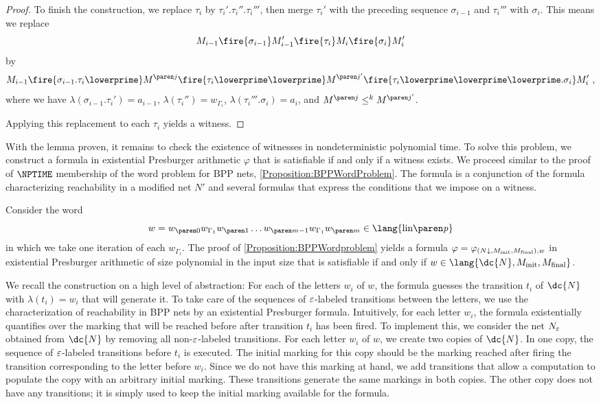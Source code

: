 \documentclass[../../diss.tex]{subfiles}
\begin{document}
\begin{proof}
    To finish the construction, we replace $\tau_i$ by $\tau_i'.\tau_i''.\tau_i'''$, then merge $\tau_i'$ with the preceding sequence $\sigma_{i-1}$ and $\tau_i'''$ with $\sigma_{i}$.
    This means we replace
    \[
        M_{i-1} \fire{\sigma_{i-1}} M_{i-1}' \fire{\tau_i} M_i \fire{\sigma_i} M_i'
    \]
    by
    \[
        M_{i-1} \fire{\sigma_{i-1}.\tau_i\lowerprime} \itr{M}{j} \fire{\tau_i\lowerprime\lowerprime} \itr{M}{j'} \fire{\tau_i\lowerprime\lowerprime\lowerprime.\sigma_i} M_i'
        \ ,
    \]
    where we have $\lambda(\sigma_{i-1}.\tau_i') = a_{i-1}$,
    $\lambda(\tau_i'') = w_{\Gamma_i}$,
    $\lambda(\tau_i'''.\sigma_{i}) = a_{i}$,
    and $\itr{M}{j} \leqk \itr{M}{j'}$.

    Applying this replacement to each $\tau_i$ yields a witness.
\end{proof}

With the lemma proven, it remains to check the existence of witnesses in nondeterministic polynomial time.
To solve this problem, we construct a formula in existential Presburger arithmetic $\varphi$ that is satisfiable if and only if a witness exists.
We proceed similar to the proof of $\NPTIME$ membership of the word problem for BPP nets, \cref{Proposition:BPPWordProblem}.
The formula is a conjunction of the formula characterizing reachability in a modified net $N'$ and several formulas that express the conditions that we impose on a witness.

Consider the word
\[
    w = \dtr{w}{0} w_{\Gamma_1} \dtr{w}{1} \ldots \dtr{w}{m-1} w_{\Gamma_1} \dtr{w}{m} \in \lang{\linof{\product}}
\]
in which we take one iteration of each $w_{\Gamma_i}$.
The proof of \cref{Proposition:BPPWordproblem} yields a formula
$\varphi = \varphi_{({N \downarrow},M_{\text{init}},M_{\text{final}}),w}$ in existential Presburger arithmetic
of size polynomial in the input size that is satisfiable if and only if $w \in \lang{\dc{N},\Minit,\Mfinal}$.

We recall the construction on a high level of abstraction:
For each of the letters $w_i$ of $w$, the formula guesses the transition $t_i$ of $\dc{N}$ with $\lambda(t_i) = w_i$ that will generate it.
To take care of the sequences of $\varepsilon$-labeled transitions between the letters, we use the characterization of reachability in BPP nets by an existential Presburger formula.
Intuitively, for each letter $w_i$, the formula existentially quantifies over the marking that will be reached before \resp after transition $t_i$ has been fired.
To  implement this, we consider the net $N_\varepsilon$ obtained from $\dc{N}$ by removing all non-$\varepsilon$-labeled transitions.
For each letter $w_i$ of $w$, we create two copies of $\dc{N}$.
In one copy, the sequence of $\varepsilon$-labeled transitions before $t_i$ is executed.
The initial marking for this copy should be the marking reached after firing the transition corresponding to the letter before $w_i$.
Since we do not have this marking at hand, we add transitions that allow a computation to populate the copy with an arbitrary initial marking.
These transitions generate the same markings in both copies.
The other copy does not have any transitions; it is simply used to keep the initial marking available for the formula.
\end{document}
